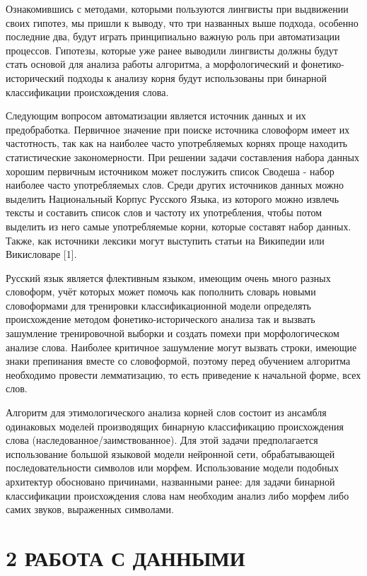 \begin{itemize}
  Ознакомившись с методами, которыми пользуются лингвисты при выдвижении своих гипотез, мы пришли к выводу, что три названных выше подхода, особенно последние два, будут играть принципиально важную роль при автоматизации процессов. Гипотезы, которые уже ранее выводили лингвисты должны будут стать основой для анализа работы алгоритма, а морфологический и фонетико-исторический подходы к анализу корня будут использованы при бинарной классификации происхождения слова.

  Следующим вопросом автоматизации является источник данных и их предобработка. Первичное значение при поиске источника словоформ имеет их частотность, так как на наиболее часто употребляемых корнях проще находить статистические закономерности. При решении задачи составления набора данных хорошим первичным источником может послужить список Сводеша - набор наиболее часто употребляемых слов. Среди других источников данных можно выделить Национальный Корпус Русского Языка, из которого можно извлечь тексты и составить список слов и частоту их употребления, чтобы потом выделить из него самые употребляемые корни, которые составят набор данных. Также, как источники лексики могут выступить статьи на Википедии или Викисловаре {[}1{]}.

  Русский язык является флективным языком, имеющим очень много разных словоформ, учёт которых может помочь как пополнить словарь новыми словоформами для тренировки классификационной модели определять происхождение методом фонетико-исторического анализа так и вызвать зашумление тренировочной выборки и создать помехи при морфологическом анализе слова. Наиболее критичное зашумление могут вызвать строки, имеющие знаки препинания вместе со словоформой, поэтому перед обучением алгоритма необходимо провести лемматизацию, то есть приведение к начальной форме, всех слов.

  Алгоритм для этимологического анализа корней слов состоит из ансамбля одинаковых моделей производящих бинарную классификацию происхождения слова (наследованное/заимствованное). Для этой задачи предполагается использование большой языковой модели нейронной сети, обрабатывающей последовательности символов или морфем. Использование модели подобных архитектур обосновано причинами, названными ранее: для задачи бинарной классификации происхождения слова нам необходим анализ либо морфем либо самих звуков, выраженных символами.
\end{itemize}

\section{2 РАБОТА С ДАННЫМИ}\label{ux440ux430ux431ux43eux442ux430-ux441-ux434ux430ux43dux43dux44bux43cux438}

